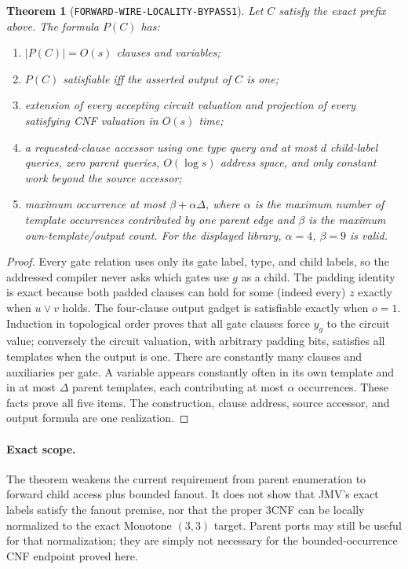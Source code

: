 \documentclass[11pt]{article}
\newtheorem{theorem}{Theorem}
\begin{document}
\begin{theorem}[\texttt{FORWARD-WIRE-LOCALITY-BYPASS1}]
\label{thm:bypass}
Let $C$ satisfy the exact prefix above.  The formula $P(C)$ has:
\begin{enumerate}[leftmargin=1.5em]
\item $|P(C)|=O(s)$ clauses and variables;
\item $P(C)$ satisfiable iff the asserted output of $C$ is one;
\item extension of every accepting circuit valuation and projection of
      every satisfying CNF valuation in $O(s)$ time;
\item a requested-clause accessor using one type query and at most $d$
      child-label queries, zero parent queries, $O(\log s)$ address space,
      and only constant work beyond the source accessor;
\item maximum occurrence at most $\beta+\alpha\Delta$, where $\alpha$ is
      the maximum number of template occurrences contributed by one
      parent edge and $\beta$ is the maximum own-template/output count.
      For the displayed library, $\alpha=4$, $\beta=9$ is valid.
\end{enumerate}
\end{theorem}

\begin{proof}
Every gate relation uses only its gate label, type, and child labels, so the
addressed compiler never asks which gates use $g$ as a child.  The padding
identity is exact because both padded clauses can hold for some (indeed
every) $z$ exactly when $u\vee v$ holds.  The four-clause output gadget is
satisfiable exactly when $o=1$.  Induction in topological order proves that
all gate clauses force $y_g$ to the circuit value; conversely the circuit
valuation, with arbitrary padding bits, satisfies all templates when the
output is one.  There are constantly many clauses and auxiliaries per gate.
A variable appears constantly often in its own template and in at most
$\Delta$ parent templates, each contributing at most $\alpha$
occurrences.  These facts prove all five items.  The construction, clause
address, source accessor, and output formula are one realization.
\end{proof}

\paragraph{Exact scope.}
The theorem weakens the current requirement from parent enumeration to
forward child access plus bounded fanout.  It does not show that JMV's
exact labels satisfy the fanout premise, nor that the proper 3CNF can be
locally normalized to the exact Monotone $(3,3)$ target.  Parent ports may
still be useful for that normalization; they are simply not necessary for
the bounded-occurrence CNF endpoint proved here.
\end{document}
